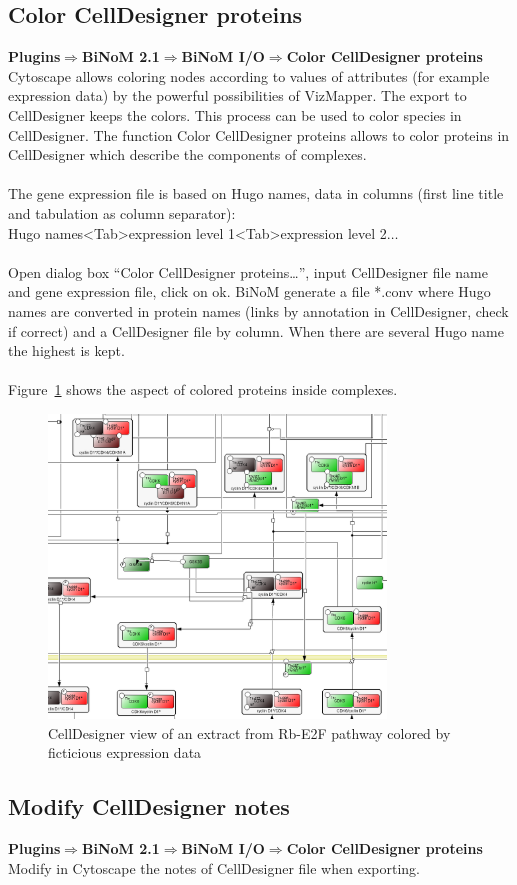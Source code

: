 \subsection{Color CellDesigner proteins}
\textbf{Plugins$\Rightarrow$BiNoM 2.1$\Rightarrow$BiNoM I/O$\Rightarrow$Color CellDesigner proteins}\\
Cytoscape allows coloring nodes according to values of attributes (for example expression data) by the powerful possibilities of VizMapper. The export to CellDesigner keeps the colors. This process can be used to color species in CellDesigner. The function Color CellDesigner proteins allows to color proteins in CellDesigner which describe the components of complexes.\\\\
The gene expression file is based on Hugo names, data in columns (first line title and tabulation as column separator):\\Hugo names\textless Tab\textgreater expression level 1\textless Tab\textgreater expression level 2$\ldots$\\\\
Open dialog box “Color CellDesigner proteins…”, input CellDesigner file name and gene expression file, click on ok. BiNoM generate a file *.conv where Hugo names are converted in protein names (links by annotation in CellDesigner, check if correct) and a CellDesigner file by column. When there are several Hugo name the highest is kept.\\\\
Figure~\ref{Colored_CellDesigner_view_by_ficticious_data} shows the aspect of colored proteins inside complexes.
\begin{figure}
\centering
\includegraphics[width=0.8\textwidth]{graphics/Colored_CellDesigner_view_by_ficticious_data}
\caption{CellDesigner view of an extract from Rb-E2F\cite{calzone2008comprehensive} pathway colored by ficticious expression data}
\label{Colored_CellDesigner_view_by_ficticious_data}
\end{figure}

\subsection{Modify CellDesigner notes}
\textbf{Plugins$\Rightarrow$BiNoM 2.1$\Rightarrow$BiNoM I/O$\Rightarrow$Color CellDesigner proteins}\\
Modify in Cytoscape the notes of CellDesigner file when exporting.
